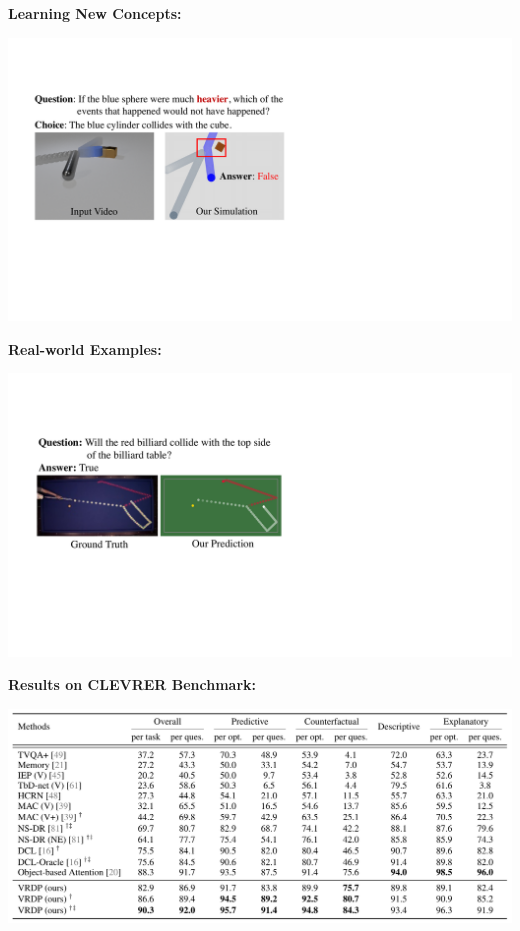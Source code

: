\documentclass[landscape,a0paper,fontscale=0.292]{baposter}
\begin{document}
\begin{poster}
{    \begin{minipage}[t]{0.37\textwidth}
        \textbf{\color{blue}Learning New Concepts:} 
        \vspace{-0.6em}
        \begin{center}
            \includegraphics[width=\textwidth]{images/few-shot.pdf}
        \end{center}
        \vspace{-0.4em}
        \textbf{\color{blue}Real-world Examples:} 
        \vspace{-0.6em}
        \begin{center}
            \includegraphics[width=\textwidth]{images/billiards.pdf}
        \end{center}
    \end{minipage}
    \hfill
    \begin{minipage}[t]{0.62\textwidth}
        \textbf{\color{blue}Results on CLEVRER Benchmark:} 
        \vspace{-0.8em}
        \begin{center}
            \includegraphics[width=\textwidth]{images/overall_exps.png}

\end{center}
\end{minipage}}
\end{poster}
\end{document}
